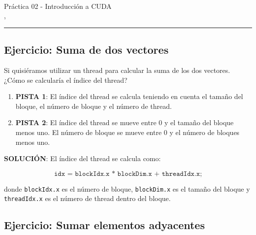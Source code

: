 



\begin{center}
  \LARGE\textbf{\coursename} \\
  \Large{Práctica 02 - Introducción a CUDA} \\
  \normalsize{\currentsemester, \currentyear} \\
  \vspace{1em}
  \hrule
\end{center}

\setcounter{section}{2}



\newpage

\tableofcontents

\newpage

\subsection{Ejercicio: Suma de dos vectores}

Si quisiéramos utilizar un thread para calcular la suma de los dos vectores. ¿Cómo se calcularía el índice del thread?

\begin{enumerate}
  \item \textbf{PISTA 1}: El índice del thread se calcula teniendo en cuenta el tamaño del bloque, el número de bloque y
    el número de thread.

  \item \textbf{PISTA 2}: El índice del thread se mueve entre 0 y el tamaño del bloque menos uno. El número de bloque
    se mueve entre 0 y el número de bloques menos uno.

\end{enumerate}

\textbf{SOLUCIÓN}: El índice del thread se calcula como:

\begin{equation}
  \texttt{idx = blockIdx.x * blockDim.x + threadIdx.x;}
\end{equation}

donde \texttt{blockIdx.x} es el número de bloque, \texttt{blockDim.x} es el tamaño del bloque y \texttt{threadIdx.x} es
el número de thread dentro del bloque.

\subsection{Ejercicio: Sumar elementos adyacentes}

